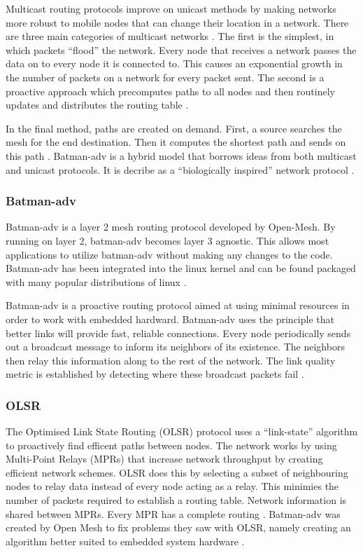 Multicast routing protocols improve on unicast methods by making networks more robust to mobile nodes that can change their location in a network. There are three main categories of multicast networks \cite{4796928}. The first is the simplest, in which packets ``flood'' the network. Every node that receives a network passes the data on to every node it is connected to. This causes an exponential growth in the number of packets on a network for every packet sent. The second is a proactive approach which precomputes paths to all nodes and then routinely updates and distributes the routing table \cite{4796928}.

In the final method, paths are created on demand. First, a source searches the mesh for the end destination. Then it computes the shortest path and sends on this path \cite{4796928}. Batman-adv is a hybrid model that borrows ideas from both multicast and unicast protocols. It is decribe as a ``biologically inspired'' network protocol \cite{0033}.  

\subsubsection{Batman-adv}

Batman-adv is a layer 2 mesh routing protocol developed by Open-Mesh. By running on layer 2, batman-adv becomes layer 3 agnostic. This allows most applications to utilize batman-adv without making any changes to the code. Batman-adv has been integrated into the linux kernel and can be found packaged with many popular distributions of linux \cite{5375690}. 

Batman-adv is a proactive routing protocol aimed at using minimal resources in order to work with embedded hardward. 
Batman-adv uses the principle that better links will provide fast, reliable connections. Every node periodically sends out a broadcast message to inform its neighbors of its existence. The neighbors then relay this information along to the rest of the network. The link quality metric is established by detecting where these broadcast packets fail \cite{5375690}. 


\subsubsection{OLSR}

The Optimised Link State Routing (OLSR) protocol uses a ``link-state'' algorithm to proactively find efficent paths between nodes. The network works by using Multi-Point Relays (MPRs) that increase network throughput by creating efficient network schemes. OLSR does this by selecting a subset of neighbouring nodes to relay data instead of every node acting as a relay. This minimies the number of packets required to establish a routing table. Network information is shared between MPRs. Every MPR has a complete routing \cite{5375690}. Batman-adv was created by Open Mesh to fix problems they saw with OLSR, namely creating an algorithm better suited to embedded system hardware \cite{0032}. 


